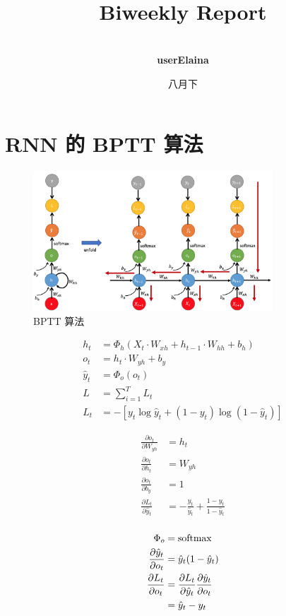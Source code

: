 \documentclass[a4paper]{article}
\title{
    \vspace*{1.0in}
     \\
    \vspace*{1in}
    \textbf{\Huge Biweekly Report}
    \vspace{0.5in}
}
\author{ \\
    \textbf{\huge userElaina} \\
    \vspace*{1in}
}
\date{\LARGE 八月下}
\begin{document}
\LARGE

\maketitle
\tableofcontents
\thispagestyle{empty}
\newpage

\section{RNN 的 BPTT 算法}

\begin{figure}[hb]
    \centering
    \includegraphics[width=0.8\textwidth]{figures/BPTT.png}
    \caption{BPTT 算法}
    \label{fig:s1}
\end{figure}

\begin{align*}
    h_t &= \Phi_h(X_t\cdot W_{xh}+h_{t−1}\cdot W_{hh}+b_h) \\
    o_t &= h_t\cdot W_{yh}+b_y \\
    \hat{y}_t &= \Phi_o(o_t) \\
    L &= \sum_{i=1}^T L_t \\
    L_t &= -[y_t\log\hat{y}_t+(1-y_t)\log(1-\hat{y}_t)]
\end{align*}

\begin{align*}
    \frac{\partial o_t}{\partial W_{yh}}
    &= h_t \\
    \frac{\partial o_t}{\partial h_t}
    &= W_{yh} \\
    \frac{\partial o_t}{\partial b_y}
    &= 1 \\
    \frac{\partial L_t}{\partial\hat{y}_t}
    &= -\frac{y_t}{\hat{y}_t}+\frac{1-y_t}{1-\hat{y}_t} \\
\end{align*}

\begin{align*}
    \Phi_o
    &= {\rm softmax} \\
    \frac{\partial\hat{y}_t}{\partial o_t}
    &= \hat{y}_t(1-\hat{y}_t) \\
    \frac{\partial L_t}{\partial o_t}
    &= \frac{\partial L_t}{\partial\hat{y}_t}\frac{\partial\hat{y}_t}{\partial o_t} \\
    &= \hat{y}_t-y_t \\
\end{align*}
\end{document}
